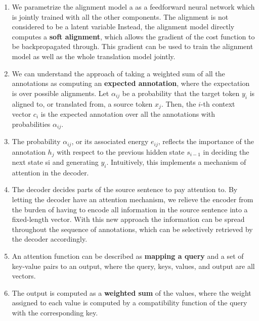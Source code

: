 \begin{enumerate}
    \item We parametrize the alignment model a as a feedforward neural network which is jointly trained with all the other components.
    The alignment is not considered to be a latent variable
    Instead, the alignment model directly computes a \textbf{soft alignment}, which allows the gradient of the cost function to be backpropagated through.
    This gradient can be used to train the alignment model as well as the whole translation model jointly.
    \hfill \cite{arxiv/1409.0473/NMT-Jointly-Learning-Align-Translate}

    \item We can understand the approach of taking a weighted sum of all the annotations as computing an \textbf{expected annotation}, where the expectation is over possible alignments. 
    Let $\alpha_{ij}$ be a probability that the target token $y_i$ is aligned to, or translated from, a source token $x_j $. 
    Then, the $i$-th context vector $c_i$ is the expected annotation over all the annotations with probabilities $\alpha_{ij} $.
    \hfill \cite{arxiv/1409.0473/NMT-Jointly-Learning-Align-Translate}

    \item The probability $\alpha_{ij} $, or its associated energy $e_{ij }$, reflects the importance of the annotation $h_j$ with respect to the previous hidden state $s_{i-1}$ in deciding the next state si and generating $y_i$. 
    Intuitively, this implements a mechanism of attention in the decoder.
    \hfill \cite{arxiv/1409.0473/NMT-Jointly-Learning-Align-Translate}
    
    \item The decoder decides parts of the source sentence to pay attention to. 
    By letting the decoder have an attention mechanism, we relieve the encoder from the burden of having to encode all information in the source sentence into a fixed-length vector. 
    With this new approach the information can be spread throughout the sequence of annotations, which can be selectively retrieved by the decoder accordingly.
    \hfill \cite{arxiv/1409.0473/NMT-Jointly-Learning-Align-Translate}

    \item An attention function can be described as \textbf{mapping a query} and a set of key-value pairs to an output, where the query, keys, values, and output are all vectors.
    \hfill \cite{arxiv/1706.03762/Attention-Is-All-You-Need}

    \item The output is computed as a \textbf{weighted sum} of the values, where the weight assigned to each value is computed by a compatibility function of the query with the corresponding key.
    \hfill \cite{arxiv/1706.03762/Attention-Is-All-You-Need}
\end{enumerate}














